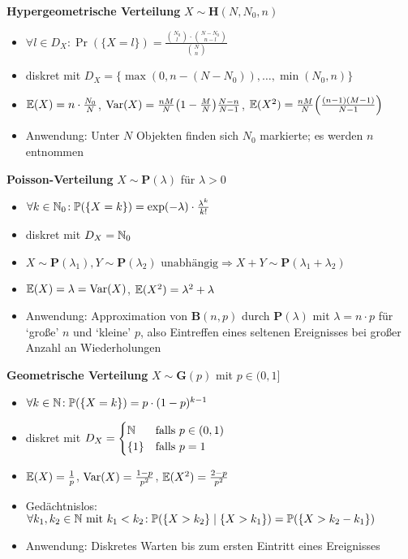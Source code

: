 \textbf{Hypergeometrische Verteilung} $X\sim\mathbf{H}(N,N_0,n)$
\begin{itemize}
\item $\forall l \in D_X\!: \Pr(\{X=l\})
  =\frac{\binom{N_0}{l} \cdot \binom{N-N_0}{n-l}}{\binom{N}{n}}$

\item diskret mit
  $D_X = \{\max(0,n-(N-N_0)),\ldots,\min(N_0,n)\}$

\item $\mathbb{E}(X) = n\cdot\frac{N_0}{N}$, $\Var(X) = \frac{nM}{N}\left(1-\frac{M}{N}\right)\frac{N-n}{N-1}$, $\E(X^2) = \frac{nM}{N}\left(\frac{(n-1)(M-1)}{N-1}\right)$

\item Anwendung: Unter $N$ Objekten finden sich $N_0$ markierte; es werden
  $n$ entnommen
\end{itemize}

\textbf{Poisson-Verteilung} $X\sim\mathbf{P}(\lambda)$ für $\lambda > 0$
\begin{itemize}
\item $\forall k\in\mathbb{N}_0\!:
  \mathbb{P}(\{X=k\}) = \exp(-\lambda) \cdot \frac{\lambda^k}{k!}$

\item diskret mit $D_X = \mathbb{N}_0$

\item $X\sim\mathbf{P}(\lambda_1), Y\sim\mathbf{P}(\lambda_2) \text{ unabhängig}
  \Rightarrow X+Y\sim\mathbf{P}(\lambda_1 + \lambda_2)$

\item $\mathbb{E}(X) = \lambda = \operatorname{Var}(X)$, $\mathbb{E}(X^2) = \lambda^2 + \lambda$

\item Anwendung: Approximation von $\mathbf{B}(n,p)$ durch $\mathbf{P}(\lambda)$
  mit $\lambda = n \cdot p$ für `große' $n$ und `kleine' $p$, also Eintreffen
  eines seltenen Ereignisses bei großer Anzahl an Wiederholungen
\end{itemize}

\newpage
\textbf{Geometrische Verteilung} $X\sim\mathbf{G}(p)$ mit $p \in (0,1]$
\begin{itemize}
\item $\forall k\in\mathbb{N}\!: \mathbb{P}(\{X=k\}) = p \cdot (1-p)^{k-1}$

\item diskret mit $D_X = \begin{cases}
\mathbb{N}              & \text{falls } p \in (0,1)  \\
\{1\}           & \text{falls } p = 1
\end{cases}$

\item $\mathbb{E}(X) = \frac{1}{p}$, $\operatorname{Var}(X) = \frac{1-p}{p^2}$,
  $\mathbb{E}(X^2) = \frac{2-p}{p^2}$

\item Gedächtnislos:\\ $\forall k_1,k_2\in\mathbb{N} \text{ mit } k_1 < k_2\!:
  \mathbb{P}(\{X > k_2\} \mid \{X > k_1\}) = \mathbb{P}(\{X > k_2 - k_1\})$

\item Anwendung: Diskretes Warten bis zum ersten Eintritt eines Ereignisses
\end{itemize}

